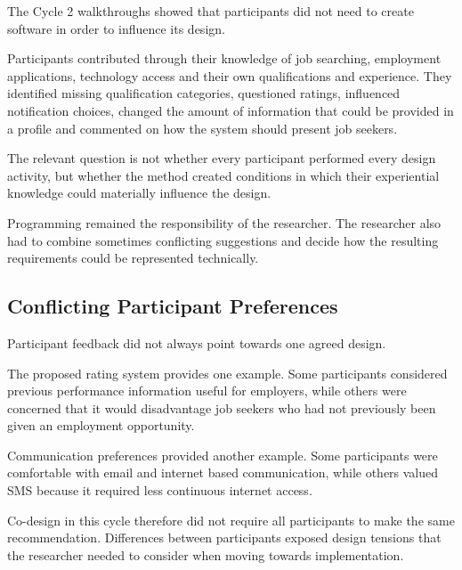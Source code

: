 The Cycle 2 walkthroughs showed that participants did not need to create software in order to influence its design.

Participants contributed through their knowledge of job searching, employment applications, technology access and their own qualifications and experience. They identified missing qualification categories, questioned ratings, influenced notification choices, changed the amount of information that could be provided in a profile and commented on how the system should present job seekers.

The relevant question is not whether every participant performed every design activity, but whether the method created conditions in which their experiential knowledge could materially influence the design.

Programming remained the responsibility of the researcher. The researcher also had to combine sometimes conflicting suggestions and decide how the resulting requirements could be represented technically.


\subsection{Conflicting Participant Preferences}

Participant feedback did not always point towards one agreed design.

The proposed rating system provides one example. Some participants considered previous performance information useful for employers, while others were concerned that it would disadvantage job seekers who had not previously been given an employment opportunity.

Communication preferences provided another example. Some participants were comfortable with email and internet based communication, while others valued SMS because it required less continuous internet access.

Co-design in this cycle therefore did not require all participants to make the same recommendation. Differences between participants exposed design tensions that the researcher needed to consider when moving towards implementation.

